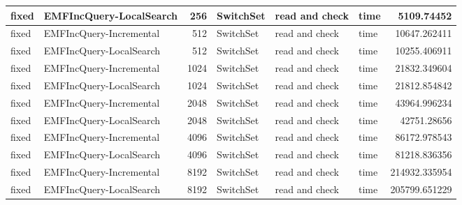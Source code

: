 \begin{table}
\begin{tabular}{| l | l | r | l | l | l | r |}
fixed & EMFIncQuery-LocalSearch & 256 & SwitchSet & read and check & time & 5109.74452\\\hline
fixed & EMFIncQuery-Incremental & 512 & SwitchSet & read and check & time & 10647.262411\\\hline
fixed & EMFIncQuery-LocalSearch & 512 & SwitchSet & read and check & time & 10255.406911\\\hline
fixed & EMFIncQuery-Incremental & 1024 & SwitchSet & read and check & time & 21832.349604\\\hline
fixed & EMFIncQuery-LocalSearch & 1024 & SwitchSet & read and check & time & 21812.854842\\\hline
fixed & EMFIncQuery-Incremental & 2048 & SwitchSet & read and check & time & 43964.996234\\\hline
fixed & EMFIncQuery-LocalSearch & 2048 & SwitchSet & read and check & time & 42751.28656\\\hline
fixed & EMFIncQuery-Incremental & 4096 & SwitchSet & read and check & time & 86172.978543\\\hline
fixed & EMFIncQuery-LocalSearch & 4096 & SwitchSet & read and check & time & 81218.836356\\\hline
fixed & EMFIncQuery-Incremental & 8192 & SwitchSet & read and check & time & 214932.335954\\\hline
fixed & EMFIncQuery-LocalSearch & 8192 & SwitchSet & read and check & time & 205799.651229\\\hline



\end{tabular}
\end{table}
